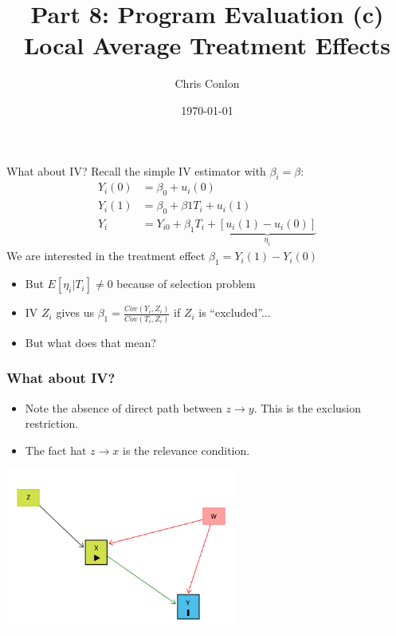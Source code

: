 \documentclass[xcolor=pdftex,dvipsnames,table,mathserif,aspectratio=169]{beamer}
\begin{document}
\title{Part 8: Program Evaluation (c)\\
Local Average Treatment Effects}
\author{Chris Conlon}
\date{\today}

\frame{\titlepage}



\begin{frame}{What about IV?}
Recall the simple IV estimator with $\beta_i = \beta$:
\begin{align*}
Y_i(0) &= \beta_0 + u_i(0)\\
Y_i(1) &= \beta_0 + \beta1 T_i +  u_i(1)\\
Y_i &= Y_{i0} + \beta_1 T_i  + \underbrace{[u_i(1) - u_i(0)]}_{\eta_i}
\end{align*}
We are interested in the \alert{treatment effect} $\beta_1 = Y_i(1) - Y_i(0)$
\begin{itemize}
\item But $E[\eta_i |  T_i] \neq 0$ because of \alert{selection problem}
\item IV $Z_i$ gives us $\beta_1 = \frac{Cov(Y_i,Z_i)}{Cov(T_i,Z_i)}$ if $Z_i$ is ``excluded''...
\item But what does that mean?
\end{itemize}
\end{frame}

\begin{frame}
\frametitle{What about IV?}
\begin{itemize}
\item Note the absence of direct path between $z \rightarrow y$. This is the \alert{exclusion restriction}.
\item The fact hat $z \rightarrow x$ is the \alert{relevance} condition.
\end{itemize}
\begin{center}
\includegraphics[width=3in]{./resources/dag-iv.png}
\end{center}

\end{frame}
\end{document}
